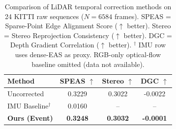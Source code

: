 \begin{table}[t]
\centering
\caption{Comparison of LiDAR temporal correction methods on 24 KITTI raw sequences ($N=6584$ frames). SPEAS = Sparse-Point Edge Alignment Score ($\uparrow$ better). Stereo = Stereo Reprojection Consistency ($\uparrow$ better). DGC = Depth Gradient Correlation ($\uparrow$ better). $^{\dagger}$ IMU row uses dense-EAS as proxy. RGB-only optical-flow baseline omitted (data not available).}
\label{tab:method_comparison}
\begin{tabular}{lccc}
\toprule
Method & SPEAS $\uparrow$ & Stereo $\uparrow$ & DGC $\uparrow$ \\
\midrule
Uncorrected & 0.3229 & 0.3022 & -0.0022 \\
IMU Baseline$^{\dagger}$ & 0.0160 & -- & -- \\
\textbf{Ours (Event)} & \textbf{0.3248} & \textbf{0.3032} & \textbf{-0.0001} \\
\bottomrule
\end{tabular}
\end{table}
